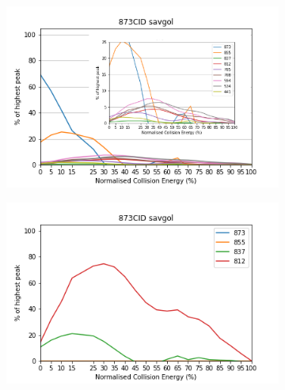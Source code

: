 \begin{figure}[!htbp]
  \begin{subfigure}[b]{0.5\textwidth}
    \includegraphics[width=\textwidth, height=\textwidth]{figures/Kapitel4/Kataboliten/diags/873CID-savgol1.png}
    \caption{}
    \label{fig:873MKLeafspraydiags1}
  \end{subfigure}
  \hfill
  \begin{subfigure}[b]{0.5\textwidth}
    \includegraphics[width=\textwidth, height=\textwidth]{figures/Kapitel4/Kataboliten/diags/873CID-savgol2.png}
    \caption{}
    \label{fig:873MKstructurediags2}
  \end{subfigure}
  

\end{figure}
